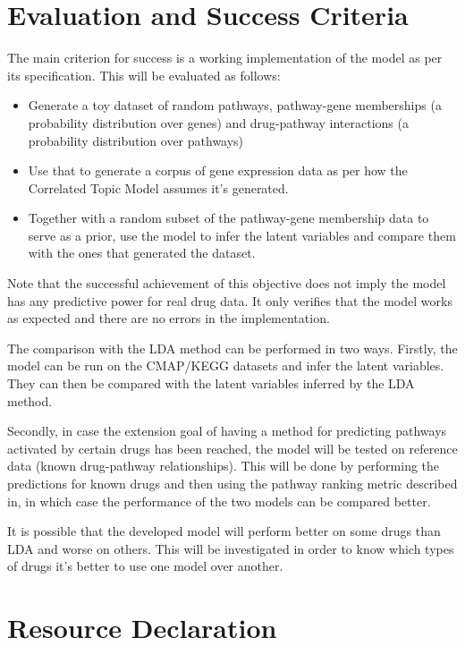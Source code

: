 \documentclass[12pt,a4]{article}
\begin{document}
\section*{Evaluation and Success Criteria}

The main criterion for success is a working implementation of the model as per its specification. This will be evaluated as follows:
\begin{itemize} 
\item Generate a toy dataset of random pathways, pathway-gene memberships (a probability distribution over genes) and drug-pathway interactions (a probability distribution over pathways)
\item Use that to generate a corpus of gene expression data as per how the Correlated Topic Model assumes it's generated.
\item Together with a random subset of the pathway-gene membership data to serve as a prior, use the model to infer the latent variables and compare them with the ones that generated the dataset.
\end{itemize}

Note that the successful achievement of this objective does not imply the model has any predictive power for real drug data. It only verifies that the model works as expected and there are no errors in the implementation.

The comparison with the LDA method can be performed in two ways. Firstly, the model can be run on the CMAP/KEGG datasets and infer the latent variables. They can then be compared with the latent variables inferred by the LDA method.

Secondly, in case the extension goal of having a method for predicting pathways activated by certain drugs has been reached, the model will be tested on reference data (known drug-pathway relationships). This will be done by performing the predictions for known drugs and then using the pathway ranking metric described in\cite{Pratanwanich2014}, in which case the performance of the two models can be compared better.

It is possible that the developed model will perform better on some drugs than LDA and worse on others. This will be investigated in order to know which types of drugs it's better to use one model over another.

\section*{Resource Declaration}
\end{document}
